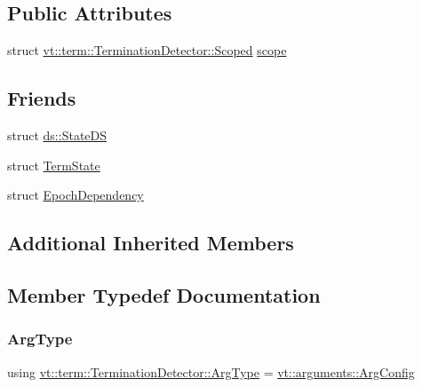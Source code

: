 \subsection*{Public Attributes}
\begin{DoxyCompactItemize}
\item 
struct \hyperlink{structvt_1_1term_1_1_termination_detector_1_1_scoped}{vt\+::term\+::\+Termination\+Detector\+::\+Scoped} \hyperlink{structvt_1_1term_1_1_termination_detector_a9027001de957f59eb36bb5784f7af4b1}{scope}
\end{DoxyCompactItemize}
\subsection*{Friends}
\begin{DoxyCompactItemize}
\item 
struct \hyperlink{structvt_1_1term_1_1_termination_detector_a9c0b991de134b4bc5bebf051bd067b9f}{ds\+::\+State\+DS}
\item 
struct \hyperlink{structvt_1_1term_1_1_termination_detector_a628421bb882cfbd05876660b5b7dc150}{Term\+State}
\item 
struct \hyperlink{structvt_1_1term_1_1_termination_detector_aee175d34803c93c65e4323ab28f04088}{Epoch\+Dependency}
\end{DoxyCompactItemize}
\subsection*{Additional Inherited Members}


\subsection{Member Typedef Documentation}
\mbox{\label{structvt_1_1term_1_1_termination_detector_a6b172cf395acf512b3f9698651c4e10d}} 
\subsubsection{\texorpdfstring{Arg\+Type}{ArgType}}
{\footnotesize\ttfamily using \hyperlink{structvt_1_1term_1_1_termination_detector_a6b172cf395acf512b3f9698651c4e10d}{vt\+::term\+::\+Termination\+Detector\+::\+Arg\+Type} =  \hyperlink{structvt_1_1arguments_1_1_arg_config}{vt\+::arguments\+::\+Arg\+Config}}

